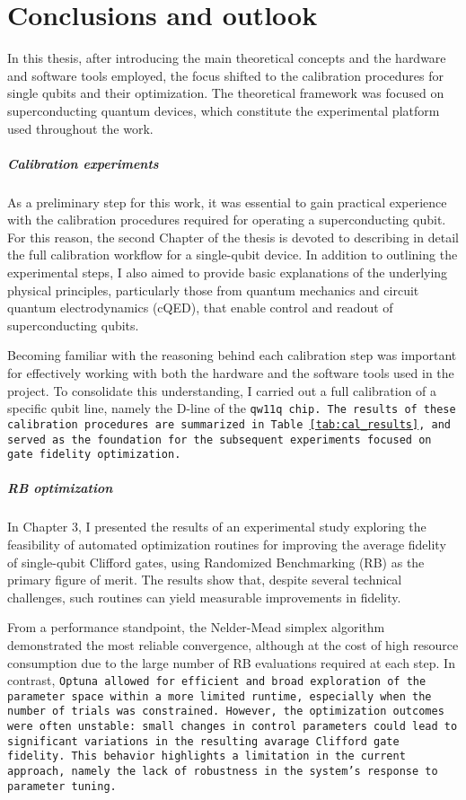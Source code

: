 \chapter{Conclusions and outlook}

In this thesis, after introducing the main theoretical concepts and the hardware and software tools employed, the focus shifted to the calibration procedures for single qubits and their optimization. 
The theoretical framework was focused on superconducting quantum devices, which constitute the experimental platform used throughout the work.

\paragraph{Calibration experiments}
As a preliminary step for this work, it was essential to gain practical experience with the calibration procedures required for operating a superconducting qubit. 
For this reason, the second Chapter of the thesis is devoted to describing in detail the full calibration workflow for a single-qubit device. 
In addition to outlining the experimental steps, I also aimed to provide basic explanations of the underlying physical principles, particularly those from quantum mechanics and circuit quantum electrodynamics (cQED), that enable control and readout of superconducting qubits. 

Becoming familiar with the reasoning behind each calibration step was important for effectively working with both the hardware and the software tools used in the project.
To consolidate this understanding, I carried out a full calibration of a specific qubit line, namely the D-line of the \tt{qw11q} chip. 
The results of these calibration procedures are summarized in Table \ref{tab:cal_results}, and served as the foundation for the subsequent experiments focused on gate fidelity optimization.

\paragraph{RB optimization}
In Chapter 3, I presented the results of an experimental study exploring the feasibility of automated optimization routines for improving the average fidelity of single-qubit Clifford gates, using Randomized Benchmarking (RB) as the primary figure of merit. 
The results show that, despite several technical challenges, such routines can yield measurable improvements in fidelity.

From a performance standpoint, the Nelder-Mead simplex algorithm demonstrated the most reliable convergence, although at the cost of high resource consumption due to the large number of RB evaluations required at each step. 
In contrast, \tt{Optuna} allowed for efficient and broad exploration of the parameter space within a more limited runtime, especially when the number of trials was constrained. 
However, the optimization outcomes were often unstable: small changes in control parameters could lead to significant variations in the resulting avarage Clifford gate fidelity. 
This behavior highlights a limitation in the current approach, namely the lack of robustness in the system's response to parameter tuning.

